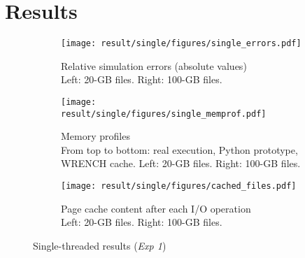 \documentclass[conference]{IEEEtran}
\newcommand{\wrench}{WRENCH\xspace}
\begin{document}


    \section{Results}
    \label{results}

    \begin{figure*}
        \centering
        \begin{subfigure}{\linewidth}
            \centering
               \texttt{[image: result/single/figures/single\_errors.pdf]}
               \vspace*{-0.7cm}
               \caption{Relative simulation errors (absolute values)\\ Left: 20-GB files. Right: 100-GB files.}
                \vspace*{0.2cm}
               \label{fig:single_error}
            \end{subfigure}
        \begin{subfigure}{\linewidth}
            \centering
               \texttt{[image: result/single/figures/single\_memprof.pdf]}
               \vspace*{-0.7cm}
               \caption{Memory profiles\\ From top to bottom: real execution, Python prototype, WRENCH cache. Left: 20-GB files. Right: 100-GB files.}
               \vspace*{0.2cm}
               \label{fig:single_memprof}
        \end{subfigure}
        \begin{subfigure}{\linewidth}
            \centering
               \texttt{[image: result/single/figures/cached\_files.pdf]}
               \caption{Page cache content after each I/O operation\\Left: 20-GB files. Right: 100-GB files.}
               \label{fig:single_cache}
        \end{subfigure}
        \caption{Single-threaded results (\textit{Exp 1})}
        \end{figure*}
\end{document}
